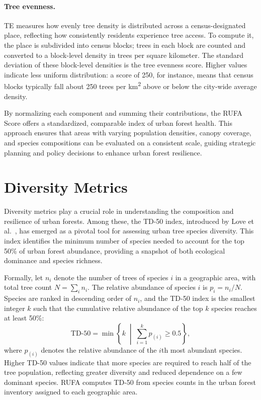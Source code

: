 \paragraph{Tree evenness.}
TE measures how evenly tree density is distributed across a census-designated place, reflecting how consistently residents experience tree access. To compute it, the place is subdivided into census blocks; trees in each block are counted and converted to a block-level density in trees per square kilometer. The standard deviation of these block-level densities is the tree evenness score. Higher values indicate less uniform distribution: a score of 250, for instance, means that census blocks typically fall about 250 trees per km\textsuperscript{2} above or below the city-wide average density.

By normalizing each component and summing their contributions, the RUFA Score offers a standardized, comparable index of urban forest health. This approach ensures that areas with varying population densities, canopy coverage, and species compositions can be evaluated on a consistent scale, guiding strategic planning and policy decisions to enhance urban forest resilience.

\section{Diversity Metrics} \label{sec:Diversity_Metrics}

Diversity metrics play a crucial role in understanding the composition and resilience of urban forests. Among these, the TD-50 index, introduced by Love et al.\ \cite{love2022}, has emerged as a pivotal tool for assessing urban tree species diversity. This index identifies the minimum number of species needed to account for the top 50\% of urban forest abundance, providing a snapshot of both ecological dominance and species richness.

Formally, let $n_i$ denote the number of trees of species $i$ in a geographic area, with total tree count $N = \sum_i n_i$. The relative abundance of species $i$ is $p_i = n_i / N$. Species are ranked in descending order of $n_i$, and the TD-50 index is the smallest integer $k$ such that the cumulative relative abundance of the top $k$ species reaches at least 50\%:
\begin{equation}
    \text{TD-50} = \min \left\{ k \;\middle|\; \sum_{i=1}^{k} p_{(i)} \geq 0.5 \right\},
    \label{eq:td50}
\end{equation}
where $p_{(i)}$ denotes the relative abundance of the $i$th most abundant species. Higher TD-50 values indicate that more species are required to reach half of the tree population, reflecting greater diversity and reduced dependence on a few dominant species. RUFA computes TD-50 from species counts in the urban forest inventory assigned to each geographic area.

